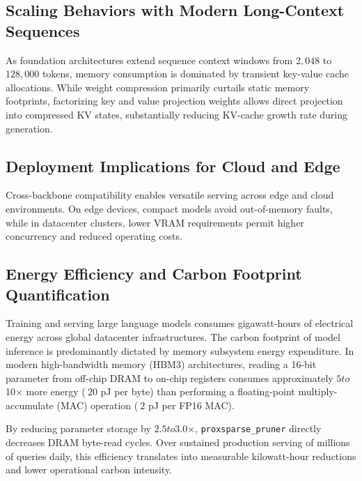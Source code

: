 \subsection{Scaling Behaviors with Modern Long-Context Sequences}
As foundation architectures extend sequence context windows from $2{,}048$ to $128{,}000$ tokens, memory consumption is dominated by transient key-value cache allocations. While weight compression primarily curtails static memory footprints, factorizing key and value projection weights allows direct projection into compressed KV states, substantially reducing KV-cache growth rate during generation.

\subsection{Deployment Implications for Cloud and Edge}
Cross-backbone compatibility enables versatile serving across edge and cloud environments. On edge devices, compact models avoid out-of-memory faults, while in datacenter clusters, lower VRAM requirements permit higher concurrency and reduced operating costs.

\subsection{Energy Efficiency and Carbon Footprint Quantification}
Training and serving large language models consumes gigawatt-hours of electrical energy across global datacenter infrastructures. The carbon footprint of model inference is predominantly dictated by memory subsystem energy expenditure. In modern high-bandwidth memory (HBM3) architectures, reading a 16-bit parameter from off-chip DRAM to on-chip registers consumes approximately $5$\times$ to $10$\times$ more energy ($~20$ pJ per byte) than performing a floating-point multiply-accumulate (MAC) operation ($~2$ pJ per FP16 MAC).

By reducing parameter storage by $2.5$\times$ to $3.0$\times$, \texttt{proxsparse\_pruner} directly decreases DRAM byte-read cycles. Over sustained production serving of millions of queries daily, this efficiency translates into measurable kilowatt-hour reductions and lower operational carbon intensity.
